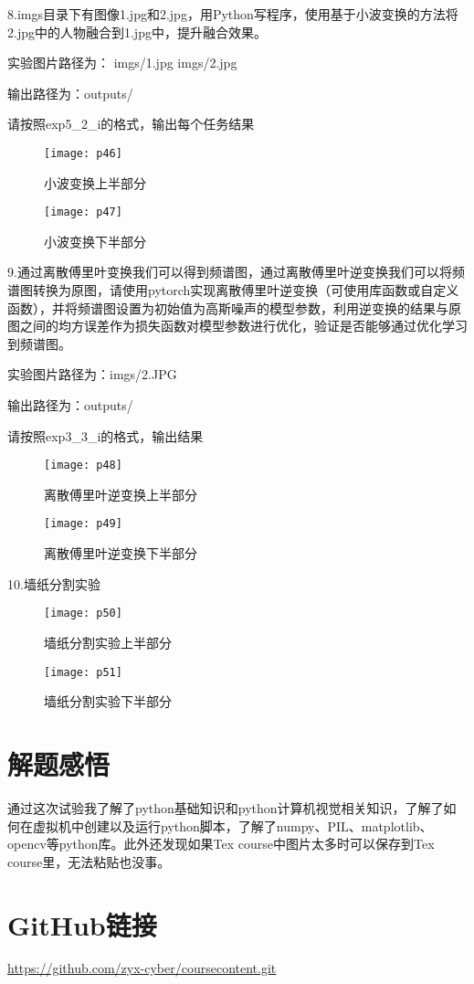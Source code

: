 \documentclass[a4paper ,12pt]{article}
\begin{document}
	8.imgs目录下有图像1.jpg和2.jpg，用Python写程序，使用基于小波变换的方法将2.jpg中的人物融合到1.jpg中，提升融合效果。
	
	实验图片路径为：
	imgs/1.jpg
	imgs/2.jpg
	
	输出路径为：outputs/
	
	请按照exp5\_2\_i的格式，输出每个任务结果
	
	 \begin{figure}[h]
		\centering
		\texttt{[image: p46]}
		\caption{小波变换上半部分}
	\end{figure}
	
	 \begin{figure}[h]
		\centering
		\texttt{[image: p47]}
		\caption{小波变换下半部分}
	\end{figure}
	
	9.通过离散傅里叶变换我们可以得到频谱图，通过离散傅里叶逆变换我们可以将频谱图转换为原图，请使用pytorch实现离散傅里叶逆变换（可使用库函数或自定义函数），并将频谱图设置为初始值为高斯噪声的模型参数，利用逆变换的结果与原图之间的均方误差作为损失函数对模型参数进行优化，验证是否能够通过优化学习到频谱图。
	
	实验图片路径为：imgs/2.JPG
	
	输出路径为：outputs/
	
	请按照exp3\_3\_i的格式，输出结果
	
	 \begin{figure}[h]
		\centering
		\texttt{[image: p48]}
		\caption{离散傅里叶逆变换上半部分}
	\end{figure}
	
	 \begin{figure}[h]
		\centering
		\texttt{[image: p49]}
		\caption{离散傅里叶逆变换下半部分}
	\end{figure}
	
	10.墙纸分割实验
	 \begin{figure}[h]
		\centering
		\texttt{[image: p50]}
		\caption{墙纸分割实验上半部分}
	\end{figure}
	
	 \begin{figure}[h]
		\centering
		\texttt{[image: p51]}
		\caption{墙纸分割实验下半部分}
	\end{figure}
	
	\section{解题感悟}
	通过这次试验我了解了python基础知识和python计算机视觉相关知识，了解了如何在虚拟机中创建以及运行python脚本，了解了numpy、PIL、matplotlib、opencv等python库。此外还发现如果Tex course中图片太多时可以保存到Tex course里，无法粘贴也没事。
	
	\section{GitHub链接}
	\href{https://github.com/zyx-cyber/coursecontent.git}{https://github.com/zyx-cyber/coursecontent.git}
	
	
\end{document}
